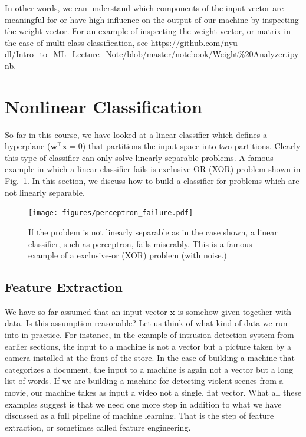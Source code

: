 \documentclass{report}
\newcommand{\vect}[1]{\mathbf{#1}}
\newcommand{\vx}[0]{\vect{x}}
\newcommand{\vw}[0]{\vect{w}}
\newcommand{\alert}[1]{\textcolor{red}{#1}}
\begin{document}
In other words, we can understand which components of the input vector are
meaningful for or have high influence on the output of our machine by inspecting
the weight vector. For an example of inspecting the weight vector, or matrix in
the case of multi-class classification, see
\url{https://github.com/nyu-dl/Intro_to_ML_Lecture_Note/blob/master/notebook/Weight%20Analyzer.ipynb}.



\section{Nonlinear Classification}

So far in this course, we have looked at a linear classifier which defines a
hyperplane ($\vw^\top \tilde{\vx} = 0$) that partitions the input space into two
partitions. Clearly this type of classifier can only solve linearly separable
problems. A famous example in which a linear classifier fails is exclusive-OR
(XOR) problem shown in Fig.~\ref{fig:perceptron_xor}. In this section, we
discuss how to build a classifier for problems which are not linearly separable.

\begin{figure}
    \centering
    \begin{minipage}{0.6\textwidth}
        \centering
        \texttt{[image: figures/perceptron\_failure.pdf]}
    \end{minipage}
    \begin{minipage}{0.39\textwidth}
        \caption{
            \label{fig:perceptron_xor}
            If the problem is not linearly separable as in the case shown, a
            linear classifier, such as perceptron, fails miserably. This is a
            famous example of a exclusive-or (XOR) problem (with noise.)
        }
    \end{minipage}
\end{figure}

\subsection{Feature Extraction}
\label{sec:feat}

We have so far assumed that an input vector $\vx$ is somehow given together with
data. Is this assumption reasonable? Let us think of what kind of data we run
into in practice. For instance, in the example of intrusion detection system
from earlier sections, the input to a machine is not a vector but a picture
taken by a camera installed at the front of the store. In the case of building a
machine that categorizes a document, the input to a machine is again not a
vector but a long list of words. If we are building a machine for detecting
violent scenes from a movie, our machine takes as input a video not a single,
flat vector. What all these examples suggest is that we need one more step in
addition to what we have discussed as a full pipeline of machine learning. That
is the step of feature extraction, or sometimes called feature engineering.
\end{document}
